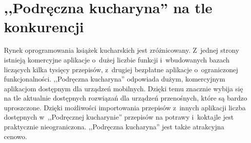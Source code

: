 \documentclass[a4paper,11pt,titlepage,twoside]{mwart}
\begin{document}
\section{,,Podręczna kucharyna'' na tle konkurencji}
Rynek oprogramowania książek kucharskich jest zróżnicowany. Z~jednej strony istnieją komercyjne aplikacje o~dużej liczbie funkcji i~wbudowanych bazach liczących kilka tysięcy przepisów, z~drugiej bezpłatne aplikacje o~ograniczonej funkcjonalności. ,,Podręczna kucharyna'' odpowiada dużym, komercyjnym aplikacjom dostępnym dla urządzeń mobilnych. Dzięki temu znacznie wybija się na tle aktualnie dostępnych rozwiązań dla urządzeń przenośnych, które są bardzo uproszczone. Dzięki możliwości importowania przepisów z~innych aplikacji liczba dostępnych w~,,Podręcznej kucharynie'' przepisów na potrawy i~koktajle jest praktycznie nieograniczona. ,,Podręczna kucharyna'' jest także atrakcyjna cenowo.
\end{document}
